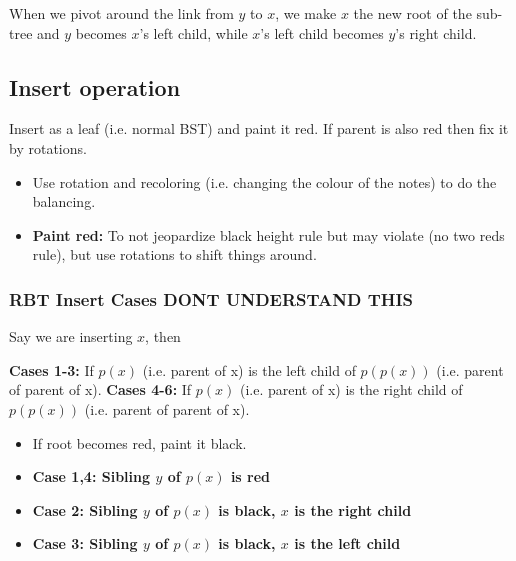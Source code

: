 \begin{intuition}
    When we pivot around the link from \( y \) to \( x \), we make \( x \) the new root of the sub-tree and \( y \) becomes \( x \)'s left child, while \( x \)'s left child becomes \( y \)'s right child.
\end{intuition}

\subsection{Insert operation}
\begin{process}
    Insert as a leaf (i.e. normal BST) and paint it red. If parent is also red then fix it by rotations. 
    \begin{itemize}
        \item Use rotation and recoloring (i.e. changing the colour of the notes) to do the balancing.
    \end{itemize}
\end{process}

\begin{intuition}
    \begin{itemize}
        \item \textbf{Paint red:} To not jeopardize black height rule but may violate (no two reds rule), but use rotations to shift things around. 
    \end{itemize}
\end{intuition}

\subsubsection{RBT Insert Cases DONT UNDERSTAND THIS}
\begin{definition} Say we are inserting $x$, then 

    \textbf{Cases 1-3:} If $p(x)$ (i.e. parent of x) is the left child of $p(p(x))$ (i.e. parent of parent of x).
    \textbf{Cases 4-6:} If $p(x)$ (i.e. parent of x) is the right child of $p(p(x))$ (i.e. parent of parent of x).
    \begin{itemize}
        \item If root becomes red, paint it black. 
    \end{itemize}

    \begin{itemize}
        \item  \textbf{Case 1,4: Sibling \( y \) of \( p(x) \) is red}

        \item \textbf{Case 2: Sibling \( y \) of $p(x)$ is black, \( x \) is the right child}

        \item \textbf{Case 3: Sibling \( y \) of $p(x)$ is black, \( x \) is the left child}
    \end{itemize}
\end{definition}